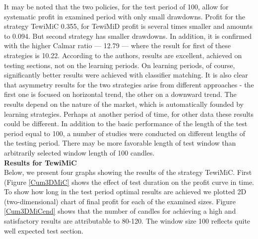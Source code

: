 \documentclass{tewiart}
\begin{document}
It may be noted that the two policies, for the test period of 100, allow for systematic profit in examined period with only small drawdowns. Profit for the strategy TewiMiC 0.355, for TewiMiD profit is several times smaller and amounts to 0.094. But second strategy has smaller drawdowns. In addition, it is confirmed with the higher Calmar ratio --- 12.79 --- where the result for first of these strategies is 10.22. According to the authors, results are excellent, achieved on testing sections, not on the learning periods. On learning periods, of course, significantly better results were achieved with classifier matching. It is also clear that asymmetry results for the two strategies arise from different approaches - the first one is focused on horizontal trend, the other on a downward trend. The results depend on the nature of the market, which is automatically founded by learning strategies. Perhaps at another period of time, for other data these results could be different. In addition to the basic performance of the length of the test period equal to 100, a number of studies were conducted on different lengths of the testing period. There may be more favorable length of test window than arbitrarily selected window length of 100 candles.\\

\textbf{Results for TewiMiC}\\
Below, we present four graphs showing the results of the strategy TewiMiC. First (Figure \ref{Cum3DMiC} shows the effect of test duration on the profit curve in time. To show how long in the test period optimal results are achieved we plotted 2D (two-dimensional) chart of final profit for each of the examined sizes. Figure \ref{Cum3DMiCend} shows that the number of candles for achieving a high and satisfactory results are attributable to 80-120. The window size 100 reflects quite well expected test section.
\end{document}
